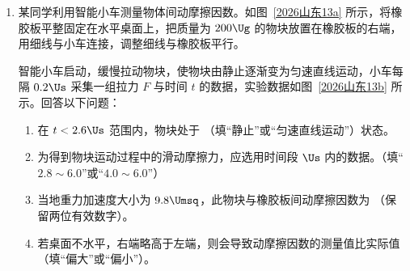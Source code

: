 \documentclass[\gkver]{gaokaozhenti}
\begin{document}
\begin{enumerate}
{结合法拉第电磁感应定律和电容的定义式可知 $\frac{Q_{1}'}{C_{1}} = \frac{Q_{2}}{C_{2}} = BLv$

联立可得 $Q_{MN} = \frac{m}{BL} \cdot \frac{Q_{2}}{C_{2}BL} = \frac{mQ_{2}}{C_{2}B^{2}L^{2}}$，$Q_{1}' = \frac{C_{1}}{C_{2}}Q_{2}$

整个过程由电荷守恒定律有 $Q_{1} = Q_{1}' + Q_{2} + Q_{MN}$

联立可得 $Q_{2} = \frac{kC_{1}C_{2}B^{2}L^{4}}{B^{2}L^{2}(C_{1} + C_{2}) + m}$，$v = \frac{Q_{2}}{C_{2}BL} = \frac{kC_{1}BL^{3}}{B^{2}L^{2}(C_{1} + C_{2}) + m}$，故 C 正确，D 错误。

故选 AC。
}

\item
某同学利用智能小车测量物体间动摩擦因数。如图~\ref{2026山东13a} 所示，将橡胶板平整固定在水平桌面上，把质量为 $200\Ug$ 的物块放置在橡胶板的右端，用细线与小车连接，调整细线与橡胶板平行。
\onepicture[num=甲, label=2026山东13a, align=right, w=7.51cm]{}

智能小车启动，缓慢拉动物块，使物块由静止逐渐变为匀速直线运动，小车每隔 $0.2\Us$ 采集一组拉力 $F$ 与时间 $t$ 的数据，实验数据如图~\ref{2026山东13b} 所示。回答以下问题：
\begin{enumerate}
	\item
	在 $t < 2.6\Us$ 范围内，物块处于 （填“静止”或“匀速直线运动”）状态。
	\item
	为得到物块运动过程中的滑动摩擦力，应选用时间段  $\Us$ 内的数据。（填“$2.8 \sim 6.0$”或“$4.0 \sim 6.0$”）
	\item
	当地重力加速度大小为 $9.8\Umsq$，此物块与橡胶板间动摩擦因数为 （保留两位有效数字）。
	\item
	若桌面不水平，右端略高于左端，则会导致动摩擦因数的测量值比实际值 （填“偏大”或“偏小”）。
\end{enumerate}
\end{enumerate}
\end{document}
